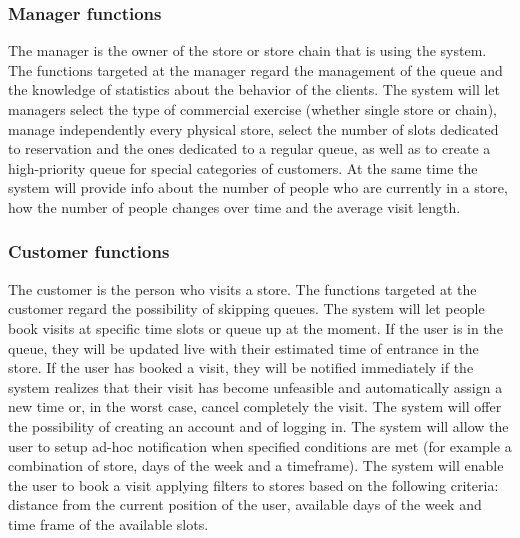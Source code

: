\subsubsection{Manager functions}
The manager is the owner of the store or store chain that is using the system.
The functions targeted at the manager regard the management of the queue and the knowledge of statistics about the behavior of the clients.
The system will let managers select the type of commercial exercise (whether single store or chain), manage independently every physical store, select the number of slots dedicated to reservation and the ones dedicated to a regular queue, as well as to create a high-priority queue for special categories of customers.
At the same time the system will provide info about the number of people who are currently in a store,
how the number of people changes over time and the average visit length.

\subsubsection{Customer functions}
The customer is the person who visits a store.
The functions targeted at the customer regard the possibility of skipping queues.
The system will let people book visits at specific time slots or queue up at the moment.
If the user is in the queue, they will be updated live with their estimated time of entrance in the store.
If the user has booked a visit, they will be notified immediately if the system realizes that
their visit has become unfeasible and automatically assign a new time or, in the worst case, cancel completely the visit.
The system will offer the possibility of creating an account and of logging in.
The system will allow the user to setup ad-hoc notification when specified conditions are met (for example a combination of store, days of the week and a timeframe).
The system will enable the user to book a visit applying filters to stores based on the following criteria: distance from the current position of the user, available days of the week and time frame of the available slots.  


